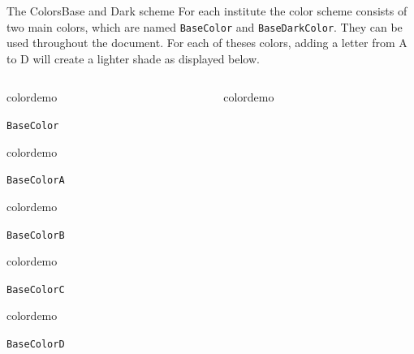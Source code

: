 \begin{frame}{The Colors}{Base and Dark scheme}
For each institute the color scheme consists of two main colors, which are named 
\texttt{BaseColor} and \texttt{BaseDarkColor}. They can be used throughout the document. For each of theses colors, adding a letter from A to D will create a lighter shade as displayed below.
%
%
%
%
%
\newdimen\bwidth
\newdimen\bheight
\newdimen\pdim
\setlength{\bwidth}{0.35\textwidth}
\setlength{\bheight}{0.5\textheight}
\setlength{\pdim}{0.05\textwidth}
\vspace{1em}%
\begin{columns}
\begin{column}{0.45\textwidth}
\begin{beamercolorbox}[dp=0pt,sep=0em,wd=\bwidth,ht=\bheight]{}
%
\begin{beamercolorbox}[sep=0em,wd=\pdim,ht=\pdim]{colordemo}%
\end{beamercolorbox}\quad\texttt{BaseColor}\newline%
%
\begin{beamercolorbox}[sep=0em,wd=\pdim,ht=\pdim]{colordemo}
\end{beamercolorbox}\quad\texttt{BaseColorA}\hfill\newline%
%
\begin{beamercolorbox}[sep=0em,wd=\pdim,ht=\pdim]{colordemo}%
\end{beamercolorbox}\quad\texttt{BaseColorB}\hfill\newline%
%
\begin{beamercolorbox}[sep=0em,wd=\pdim,ht=\pdim]{colordemo}%
\end{beamercolorbox}\quad\texttt{BaseColorC}\hfill\newline%
%
\begin{beamercolorbox}[sep=0em,wd=\pdim,ht=\pdim]{colordemo}%
\end{beamercolorbox}\quad\texttt{BaseColorD}%
\end{beamercolorbox}%
\end{column}
%
% 
%
\begin{column}{0.45\textwidth}
\begin{beamercolorbox}[dp=0pt,sep=0em,wd=\bwidth,ht=\bheight]{}
%
\begin{beamercolorbox}[sep=0em,wd=\pdim,ht=\pdim]{colordemo}%

\end{beamercolorbox}
\end{beamercolorbox}
\end{column}
\end{columns}
\end{frame}

